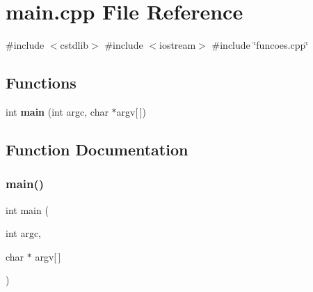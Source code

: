 \section{main.\+cpp File Reference}
\label{main_8cpp}
{\ttfamily \#include $<$cstdlib$>$}\newline
{\ttfamily \#include $<$iostream$>$}\newline
{\ttfamily \#include \char`\"{}funcoes.\+cpp\char`\"{}}\newline
\subsection*{Functions}
\begin{DoxyCompactItemize}
\item 
int \textbf{ main} (int argc, char $\ast$argv[$\,$])
\end{DoxyCompactItemize}


\subsection{Function Documentation}
\mbox{\label{main_8cpp_a0ddf1224851353fc92bfbff6f499fa97}} 
\subsubsection{main()}
{\footnotesize\ttfamily int main (\begin{DoxyParamCaption}\item[{int}]{argc,  }\item[{char $\ast$}]{argv[$\,$] }\end{DoxyParamCaption})}

